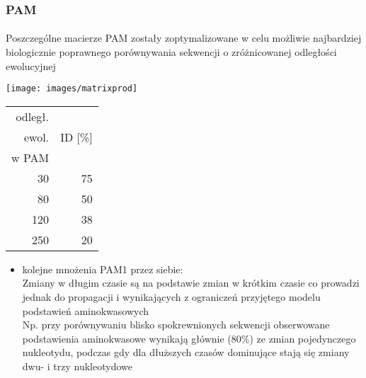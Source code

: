 \begin{frame}
 \frametitle{PAM}
 \framesubtitle{}
\scriptsize

 Poszczególne macierze PAM zostały zoptymalizowane w celu możliwie
 najbardziej biologicznie poprawnego porównywania sekwencji o
 zróżnicowanej odległości ewolucyjnej

\begin{minipage}[t]{.3\textwidth}\vspace{0pt}

\begin{center}
\texttt{[image: images/matrixprod]}
\end{center}

\begin{tabular}{r | r}
odległ. & \\
ewol.   & ID [\%]\\
w PAM   & \\
\hline
30 & 75 \\
80 & 50 \\
120 & 38 \\
250 & 20
\end{tabular}
\end{minipage}\hspace{.05\textwidth}
\begin{minipage}[t]{.64\textwidth}\vspace{0pt}
\begin{itemize}
 \item kolejne mnożenia PAM1 przez siebie: \\[2ex]

 Zmiany w długim czasie są  na podstawie zmian w
 krótkim czasie co prowadzi jednak do propagacji i  wynikających z ograniczeń przyjętego modelu podstawień
 aminokwasowych\\[2ex]

 Np. przy porównywaniu blisko spokrewnionych sekwencji obserwowane
 podstawienia aminokwasowe wynikają głównie (80\%) ze zmian
 pojedynczego nukleotydu, podczas gdy dla dłuższych czasów dominujące
 stają się zmiany dwu- i trzy nukleotydowe
\end{itemize}
\end{minipage}\vfill~

\end{frame}

